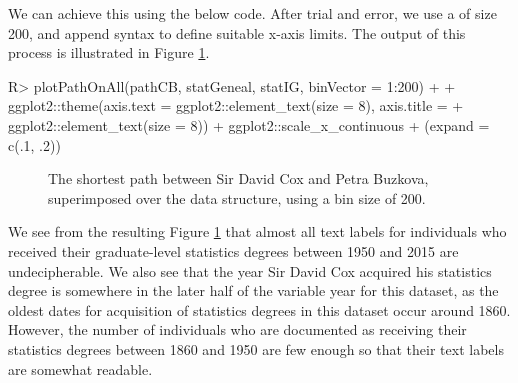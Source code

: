 \documentclass[article,shortnames]{jss}
\begin{document}
We can achieve this using the below code. After trial and error, we use a  of size 200, and append  syntax to define suitable x-axis limits. The output of this process is illustrated in Figure \ref{fig:plotCBText}.

\begin{CodeChunk}
\begin{CodeInput}
R> plotPathOnAll(pathCB, statGeneal, statIG, binVector = 1:200) +
+    ggplot2::theme(axis.text = ggplot2::element_text(size = 8), axis.title =
+    ggplot2::element_text(size = 8)) + ggplot2::scale_x_continuous
+    (expand = c(.1, .2))
\end{CodeInput}
\end{CodeChunk}

\begin{figure}[H]
    \centering
    \caption{The shortest path between Sir David Cox and Petra Buzkova, superimposed over the data structure, using a bin size of 200.}
    \label{fig:plotCBText}
\end{figure}

We see from the resulting Figure \ref{fig:plotCBText} that almost all text labels for individuals who received their graduate-level statistics degrees between 1950 and 2015 are undecipherable. We also see that the year Sir David Cox acquired his statistics degree is somewhere in the later half of the variable year for this dataset, as the oldest dates for acquisition of statistics degrees in this dataset occur around 1860. However, the number of individuals who are documented as receiving their statistics degrees between 1860 and 1950 are few enough so that their text labels are somewhat readable.
\end{document}

